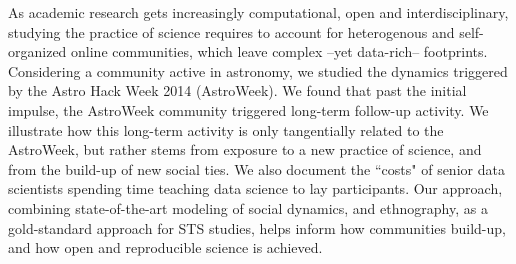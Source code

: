 As academic research gets increasingly computational, open and interdisciplinary, studying the practice of science requires to account for heterogenous and self-organized online communities, which leave complex --yet data-rich-- footprints. Considering a community active in astronomy, we studied the dynamics triggered by the Astro Hack Week 2014 (AstroWeek). We found that past the initial impulse, the AstroWeek community triggered long-term follow-up activity. We illustrate how this long-term activity is only tangentially related to the AstroWeek, but rather stems from exposure to a new practice of science, and from the build-up of new social ties. We also document the ``costs"  of senior data scientists spending time teaching data science to lay participants. Our approach, combining state-of-the-art modeling of social dynamics, and ethnography, as a gold-standard approach for STS studies, helps inform how communities build-up, and how open and reproducible science is achieved.